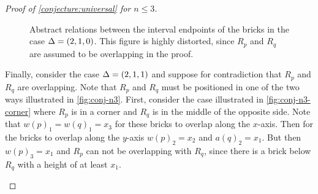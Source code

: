 \begin{proof}[Proof of \cref{conjecture:universal} for $n \leq 3$]
\begin{figure}[ht]
    \caption{Abstract relations between the interval endpoints of the bricks in the case $\Delta = \left( 2, 1, 0 \right)$. This figure is highly distorted, since $R_p$ and $R_q$ are assumed to be overlapping in the proof.}
    \label{fig:conj-n2}
\end{figure}
Finally, consider the case $\Delta = \left( 2, 1, 1 \right)$ and suppose for contradiction that $R_p$ and $R_q$ are overlapping. Note that $R_p$ and $R_q$ must be positioned in one of the two ways illustrated in \cref{fig:conj-n3}. First, consider the case illustrated in \cref{fig:conj-n3-corner} where $R_p$ is in a corner and $R_q$ is in the middle of the opposite side. Note that $w(p)_1 = w(q)_1 = x_3$ for these bricks to overlap along the $x$-axis. Then for the bricks to overlap along the $y$-axis $w(p)_2 = x_2$ and $a(q)_2 = x_1$. But then $w(p)_3 = x_1$ and $R_p$ can not be overlapping with $R_q$, since there is a brick below $R_q$ with a height of at least $x_1$.
\begin{figure}[ht]
    \centering
    \begin{subfigure}[b]{0.47\textwidth}
        \centering
\end{subfigure}
\end{figure}
\end{proof}
